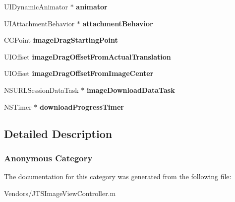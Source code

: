 \begin{DoxyCompactItemize}
\item 
\hypertarget{category_j_t_s_image_view_controller_07_08_a91953af278021459b0295126871d3cab}{}U\+I\+Dynamic\+Animator $\ast$ {\bfseries animator}\label{category_j_t_s_image_view_controller_07_08_a91953af278021459b0295126871d3cab}

\item 
\hypertarget{category_j_t_s_image_view_controller_07_08_aab29764ecbc8809e10df235c56d9596b}{}U\+I\+Attachment\+Behavior $\ast$ {\bfseries attachment\+Behavior}\label{category_j_t_s_image_view_controller_07_08_aab29764ecbc8809e10df235c56d9596b}

\item 
\hypertarget{category_j_t_s_image_view_controller_07_08_aebbce3cfb94d8a60e0c3b5d383c0626b}{}C\+G\+Point {\bfseries image\+Drag\+Starting\+Point}\label{category_j_t_s_image_view_controller_07_08_aebbce3cfb94d8a60e0c3b5d383c0626b}

\item 
\hypertarget{category_j_t_s_image_view_controller_07_08_acfe7cb510b3c635eea29bad4dcd5cc20}{}U\+I\+Offset {\bfseries image\+Drag\+Offset\+From\+Actual\+Translation}\label{category_j_t_s_image_view_controller_07_08_acfe7cb510b3c635eea29bad4dcd5cc20}

\item 
\hypertarget{category_j_t_s_image_view_controller_07_08_a8e1a87a328ae14f039a5aa0a57cdd783}{}U\+I\+Offset {\bfseries image\+Drag\+Offset\+From\+Image\+Center}\label{category_j_t_s_image_view_controller_07_08_a8e1a87a328ae14f039a5aa0a57cdd783}

\item 
\hypertarget{category_j_t_s_image_view_controller_07_08_a176e2b631c518bb9a2880590def15f4f}{}N\+S\+U\+R\+L\+Session\+Data\+Task $\ast$ {\bfseries image\+Download\+Data\+Task}\label{category_j_t_s_image_view_controller_07_08_a176e2b631c518bb9a2880590def15f4f}

\item 
\hypertarget{category_j_t_s_image_view_controller_07_08_a717c998cc085c0fae418a8850d0a7408}{}N\+S\+Timer $\ast$ {\bfseries download\+Progress\+Timer}\label{category_j_t_s_image_view_controller_07_08_a717c998cc085c0fae418a8850d0a7408}

\end{DoxyCompactItemize}


\subsection{Detailed Description}


 \subsubsection*{Anonymous Category }

The documentation for this category was generated from the following file\+:\begin{DoxyCompactItemize}
\item 
Vendors/J\+T\+S\+Image\+View\+Controller.\+m\end{DoxyCompactItemize}
